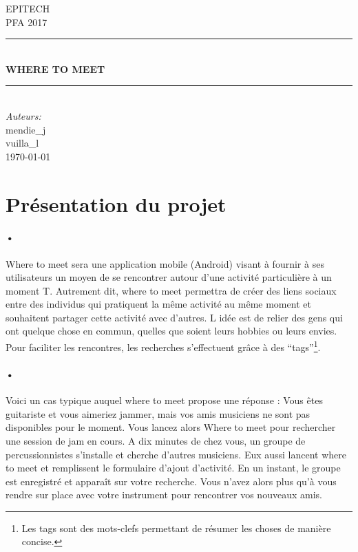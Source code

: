 \documentclass[pdftex,12pt,a4paper]{article}
\newcommand{\HRule}{\rule{\linewidth}{0.5mm}}
\begin{document}
\begin{titlepage}
\begin{center}

\textsc{\LARGE EPITECH}\\[1.5cm]
\textsc{\Large PFA 2017}\\[0.5cm]
\HRule \\[0.4cm]
{\huge \bfseries WHERE TO MEET \\[0.4cm]}
\HRule \\[1.5cm]

\emph{Auteurs:}\\
mendie\_j \\
vuilla\_l \\

\vfill
{\large \today}

\end{center}
\end{titlepage}
\section{Pr\'esentation du projet}
\paragraph{•}
Where to meet sera une application mobile (Android) visant \`a fournir \`a ses  utilisateurs un moyen de se rencontrer autour d’une activit\'e particuli\`ere à un moment T.
Autrement dit, where to meet permettra de cr\'eer des liens sociaux entre des individus qui pratiquent la m\^eme activit\'e au m\^eme moment et souhaitent partager cette activit\'e avec d’autres. L id\'ee est de relier des gens qui ont quelque chose en commun, quelles que soient leurs hobbies ou leurs envies. 
Pour faciliter les rencontres, les recherches s’effectuent gr\^ace à des “tags”\footnote{Les tags sont des mots-clefs permettant de r\'esumer les choses de manière concise.
}.

\paragraph{•}
Voici un cas typique auquel where to meet propose une r\'eponse :
Vous \^etes guitariste et vous aimeriez jammer, mais vos amis musiciens ne sont pas disponibles pour le moment. Vous lancez alors Where to meet pour rechercher une session de jam en cours. A dix minutes de chez vous, un groupe de percussionnistes s'installe et cherche d’autres musiciens. Eux aussi lancent where to meet et remplissent le formulaire d’ajout d'activit\'e. En un instant, le groupe est enregistr\'e et appara\^it sur votre recherche. Vous n’avez alors plus qu’à vous rendre sur place avec votre instrument pour rencontrer vos nouveaux amis.
\end{document}
